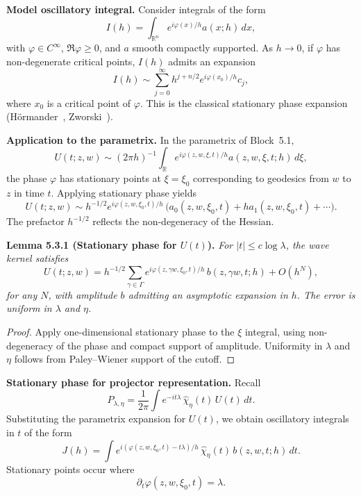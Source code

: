 \noindent\textbf{Model oscillatory integral.}
Consider integrals of the form
\[
  I(h) = \int_{\mathbb{R}^n} e^{i\varphi(x)/h} a(x;h)\, dx,
\]
with $\varphi\in C^\infty$, $\Re \varphi\ge 0$, and $a$ smooth compactly supported.
As $h\to 0$, if $\varphi$ has non-degenerate critical points,
$I(h)$ admits an expansion
\[
  I(h) \sim \sum_{j=0}^\infty h^{j+n/2} e^{i\varphi(x_0)/h} c_j,
\]
where $x_0$ is a critical point of $\varphi$.
This is the classical stationary phase expansion
(Hörmander~\cite{Hormander1994}, Zworski~\cite{Zworski2012}).

\medskip

\noindent\textbf{Application to the parametrix.}
In the parametrix of Block~5.1,
\[
  U(t;z,w) \sim (2\pi h)^{-1} \int_{\mathbb{R}} e^{i\varphi(z,w,\xi,t)/h} a(z,w,\xi,t;h)\, d\xi,
\]
the phase $\varphi$ has stationary points at $\xi=\xi_0$ corresponding to geodesics
from $w$ to $z$ in time $t$.
Applying stationary phase yields
\[
  U(t;z,w) \sim h^{-1/2} e^{i\varphi(z,w,\xi_0,t)/h}\,
  \Big( a_0(z,w,\xi_0,t) + h a_1(z,w,\xi_0,t) + \cdots \Big).
\]
The prefactor $h^{-1/2}$ reflects the non-degeneracy of the Hessian.

\medskip

\noindent\textbf{Lemma 5.3.1 (Stationary phase for $U(t)$).}
\emph{For $|t|\le c\log \lambda$,
the wave kernel satisfies}
\[
  U(t;z,w) = h^{-1/2} \sum_{\gamma\in \Gamma}
  e^{i\varphi(z,\gamma w,\xi_0,t)/h}\,
  b(z,\gamma w,t;h) + O(h^N),
\]
\emph{for any $N$, with amplitude $b$ admitting an asymptotic expansion in $h$.
The error is uniform in $\lambda$ and $\eta$.}

\begin{proof}
Apply one-dimensional stationary phase to the $\xi$ integral,
using non-degeneracy of the phase and compact support of amplitude.
Uniformity in $\lambda$ and $\eta$ follows from Paley–Wiener support of the cutoff.
\end{proof}

\medskip

\noindent\textbf{Stationary phase for projector representation.}
Recall
\[
  P_{\lambda,\eta} = \frac{1}{2\pi}\int e^{-it\lambda}\, \widehat{\chi}_\eta(t)\, U(t)\, dt.
\]
Substituting the parametrix expansion for $U(t)$,
we obtain oscillatory integrals in $t$ of the form
\[
  J(h) = \int e^{i(\varphi(z,w,\xi_0,t) - t\lambda)/h}\,
  \widehat{\chi}_\eta(t)\, b(z,w,t;h)\, dt.
\]
Stationary points occur where
\[
  \partial_t \varphi(z,w,\xi_0,t) = \lambda.
\]

\medskip

